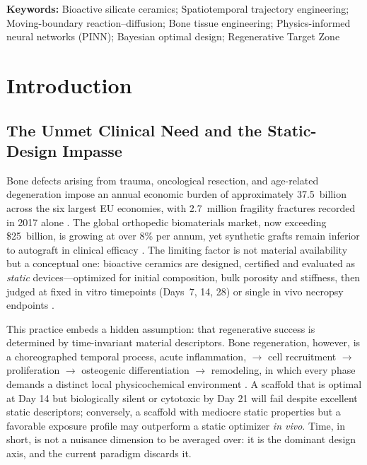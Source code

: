 \documentclass[11pt]{article}
\begin{document}
\vspace{0.5em}

\noindent\textbf{Keywords:} Bioactive silicate ceramics; Spatiotemporal trajectory engineering; Moving-boundary reaction–diffusion; Bone tissue engineering; Physics-informed neural networks (PINN); Bayesian optimal design; Regenerative Target Zone

\vspace{1.0em}

\section{Introduction}
\label{sec:intro}


\subsection{The Unmet Clinical Need and the Static-Design Impasse}


Bone defects arising from trauma, oncological resection, and age-related degeneration impose an annual economic burden of approximately \texteuro{}37.5~billion across the six largest EU economies, with 2.7~million fragility fractures recorded in 2017 alone \cite{Hernlund2013}. The global orthopedic biomaterials market, now exceeding \$25~billion, is growing at over 8\% per annum, yet synthetic grafts remain inferior to autograft in clinical efficacy \cite{Singh2024,Ahmed2024,Grant2024}. The limiting factor is not material availability but a conceptual one: bioactive ceramics are designed, certified and evaluated as \emph{static} devices---optimized for initial composition, bulk porosity and stiffness, then judged at fixed in vitro timepoints (Days~7, 14, 28) or single in vivo necropsy endpoints \cite{Jones2024,Huebsch2015,Bao2020}.


This practice embeds a hidden assumption: that regenerative success is determined by time-invariant material descriptors. Bone regeneration, however, is a choreographed temporal process, acute inflammation, $\rightarrow$ cell recruitment $\rightarrow$ proliferation $\rightarrow$ osteogenic differentiation $\rightarrow$ remodeling, in which every phase demands a distinct local physicochemical environment \cite{Tian2022,Liu2024}. A scaffold that is optimal at Day 14 but biologically silent or cytotoxic by Day 21 will fail despite excellent static descriptors; conversely, a scaffold with mediocre static properties but a favorable exposure profile may outperform a static optimizer \emph{in vivo}. Time, in short, is not a nuisance dimension to be averaged over: it is the dominant design axis, and the current paradigm discards it.
\end{document}
